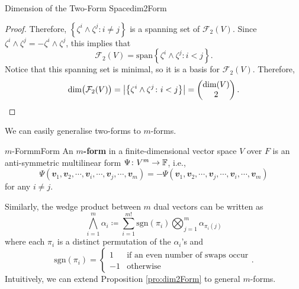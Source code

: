 \documentclass[math]{amznotes}
\theoremstyle{remark}
\begin{document}
\begin{probox}{Dimension of the Two-Form Space}{dim2Form}
\begin{proof}
        Therefore, $\left\{\zeta^i \wedge \zeta^j \colon i \neq j\right\}$ is a spanning set of $\mathcal{F}_2(V)$. Since $\zeta^i\wedge\zeta^j = -\zeta^i\wedge\zeta^j$, this implies that 
        \begin{equation*}
            \mathcal{F}_2(V) = \mathrm{span}\left\{\zeta^i \wedge \zeta^j \colon i < j\right\}.
        \end{equation*}
        Notice that this spanning set is minimal, so it is a basis for $\mathcal{F}_2(V)$. Therefore, 
        \begin{equation*}
            \dim\bigl(\mathcal{F}_2(V)\bigr) = {\left\lvert {\left\{\zeta^i \wedge \zeta^j \colon i < j\right\}} \right\rvert} = \begin{pmatrix}
                \dim(V) \\ 
                2
            \end{pmatrix}.
        \end{equation*}
    \end{proof}
\end{probox}
We can easily generalise two-forms to $m$-forms.
\begin{dfnbox}{$m$-Form}{mForm}
    An {\color{red} \textbf{$m$-form}} in a finite-dimensional vector space $V$ over $F$ is an anti-symmetric multilinear form $\Psi \colon V^m \to \mathbb{F}$, i.e.,
    \begin{equation*}
        \Psi\left(\mathbfit{v}_1, \mathbfit{v}_2, \cdots, \mathbfit{v}_i, \cdots, \mathbfit{v}_j, \cdots, \mathbfit{v}_m\right) = -\Psi\left(\mathbfit{v}_1, \mathbfit{v}_2, \cdots, \mathbfit{v}_j, \cdots, \mathbfit{v}_i, \cdots, \mathbfit{v}_m\right)
    \end{equation*}
    for any $i \neq j$.
\end{dfnbox}
Similarly, the wedge product between $m$ dual vectors can be written as 
\begin{equation*}
    \bigwedge_{i = 1}^m\alpha_i \coloneqq \sum_{i = 1}^{m!}\mathrm{sgn}\left(\pi_i\right)\bigotimes_{j = 1}^m\alpha_{\pi_i(j)}
\end{equation*}
where each $\pi_i$ is a distinct permutation of the $\alpha_i$'s and
\begin{equation*}
    \mathrm{sgn}\left(\pi_i\right) = \begin{cases}
        1 & \textrm{if an even number of swaps occur} \\
        -1 & \textrm{otherwise}
    \end{cases}.
\end{equation*}
Intuitively, we can extend Proposition \ref{pro:dim2Form} to general $m$-forms.
\end{document}
